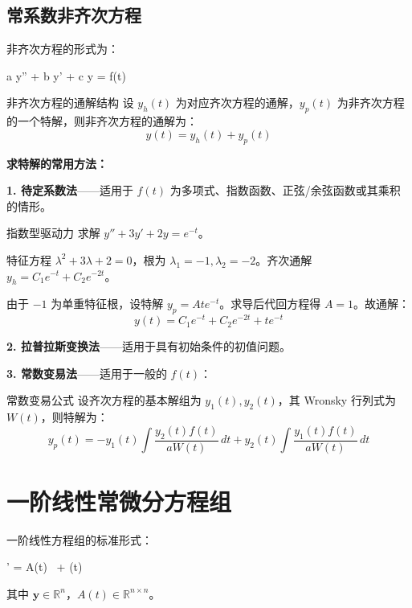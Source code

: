 \subsection{常系数非齐次方程}

非齐次方程的形式为：
\begin{myformula}
	a y'' + b y' + c y = f(t)
\end{myformula}

\begin{theorem}{非齐次方程的通解结构}
	设 $y_h(t)$ 为对应齐次方程的通解，$y_p(t)$ 为非齐次方程的一个特解，则非齐次方程的通解为：
	\[
	y(t) = y_h(t) + y_p(t)
	\]
\end{theorem}

\textbf{求特解的常用方法：}

\medskip
\textbf{1. 待定系数法}——适用于 $f(t)$ 为多项式、指数函数、正弦/余弦函数或其乘积的情形。

\begin{example}{指数型驱动力}
	求解 $y'' + 3y' + 2y = e^{-t}$。
\end{example}

\begin{solution}
	特征方程 $\lambda^2 + 3\lambda + 2 = 0$，根为 $\lambda_1 = -1, \lambda_2 = -2$。齐次通解 $y_h = C_1 e^{-t} + C_2 e^{-2t}$。
	
	由于 $-1$ 为单重特征根，设特解 $y_p = A t e^{-t}$。求导后代回方程得 $A = 1$。故通解：
	\[
	y(t) = C_1 e^{-t} + C_2 e^{-2t} + t e^{-t}
	\]
\end{solution}

\medskip
\textbf{2. 拉普拉斯变换法}——适用于具有初始条件的初值问题。

\medskip
\textbf{3. 常数变易法}——适用于一般的 $f(t)$：

\begin{theorem}{常数变易公式}
	设齐次方程的基本解组为 $y_1(t), y_2(t)$，其 Wronsky 行列式为 $W(t)$，则特解为：
	\[
	y_p(t) = -y_1(t) \int \frac{y_2(t) f(t)}{a W(t)} \, dt + y_2(t) \int \frac{y_1(t) f(t)}{a W(t)} \, dt
	\]
\end{theorem}

\section{一阶线性常微分方程组}

一阶线性方程组的标准形式：
\begin{myformula}
	' = A(t) \,  + (t)
\end{myformula}
其中 $\mathbf{y} \in \mathbb{R}^n$，$A(t) \in \mathbb{R}^{n \times n}$。

